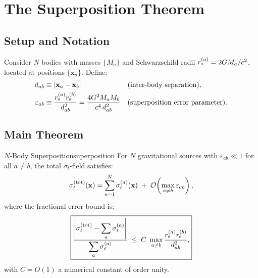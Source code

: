 \documentclass[11pt,a4paper]{article}
\theoremstyle{definition}
\theoremstyle{remark}
\newcommand{\rs}[1]{r_{\rm s}^{(#1)}}
\newcommand{\sig}[2]{\sigma_{#1}^{(#2)}}
\newcommand{\boldx}{\mathbf{x}}
\begin{document}
	\section{The Superposition Theorem}
	\label{sec:proof}
	
	\subsection{Setup and Notation}
	
	Consider $N$ bodies with masses $\{M_a\}$ and Schwarzschild radii
	$\rs{a}=2GM_a/c^2$, located at positions $\{\boldx_a\}$.  Define:
	\begin{align}
		d_{ab} &\equiv |\boldx_a-\boldx_b| & &\text{(inter-body separation)},\\
		\varepsilon_{ab} &\equiv \frac{\rs{a}\rs{b}}{d_{ab}^2}
		= \frac{4G^2M_aM_b}{c^4\,d_{ab}^2} & &\text{(superposition error parameter)}.
		\label{eq:epsilon_def}
	\end{align}
	
	\subsection{Main Theorem}
	
	\begin{theorem}{$N$-Body Superposition}{superposition}
		For $N$ gravitational sources with $\varepsilon_{ab}\ll1$ for all
		$a\neq b$, the total $\sigma_t$-field satisfies:
		\begin{equation}
			\sigma_t^{(\rm tot)}(\boldx)
			= \sum_{a=1}^N \sig{t}{a}(\boldx)
			\;+\;
			\mathcal{O}\!\left(\max_{a\neq b}\varepsilon_{ab}\right),
			\label{eq:superposition_theorem}
		\end{equation}
		where the fractional error bound is:
		\begin{equation}
			\boxed{
				\frac{\left|\sigma_t^{(\rm tot)}
					-\displaystyle\sum_a\sig{t}{a}\right|}
				{\displaystyle\sum_a\sig{t}{a}}
				\;\leq\;
				C\;\max_{a\neq b}\frac{\rs{a}\rs{b}}{d_{ab}^2},
			}
			\label{eq:error_bound}
		\end{equation}
		with $C=O(1)$ a numerical constant of order unity.
	\end{theorem}
	
\end{document}
